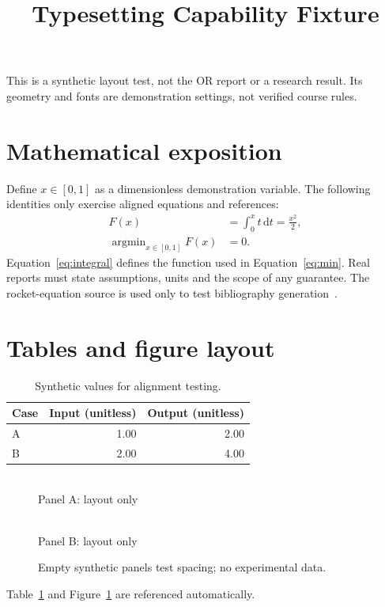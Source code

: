 \documentclass[11pt,a4paper]{article}
\title{Typesetting Capability Fixture}
\author{}\date{}
\begin{document}
\maketitle
\noindent This is a synthetic layout test, not the OR report or a research result.
Its geometry and fonts are demonstration settings, not verified course rules.
\tableofcontents
\section{Mathematical exposition}\label{sec:math}
Define $x\in[0,1]$ as a dimensionless demonstration variable. The following
identities only exercise aligned equations and references:
\begin{align}
F(x)&=\int_0^x t\,\mathrm{d}t=\frac{x^2}{2},\label{eq:integral}\\
\operatorname{argmin}_{x\in[0,1]}F(x)&=0.\label{eq:min}
\end{align}
Equation~\eqref{eq:integral} defines the function used in Equation~\eqref{eq:min}.
Real reports must state assumptions, units and the scope of any guarantee.
The rocket-equation source is used only to test bibliography generation~\citep{nasa-rocket}.
\section{Tables and figure layout}
\begin{table}[htbp]\centering
\caption{Synthetic values for alignment testing.}\label{tab:short}
\begin{tabular}{lrr}\toprule
Case & Input (unitless) & Output (unitless)\\\midrule
A & 1.00 & 2.00\\ B & 2.00 & 4.00\\\bottomrule
\end{tabular}\end{table}
\begin{figure}[htbp]\centering
\begin{minipage}{.45\linewidth}\centering\fbox{\rule{0pt}{18mm}\rule{.85\linewidth}{0pt}}
\\Panel A: layout only\end{minipage}\hfill
\begin{minipage}{.45\linewidth}\centering\fbox{\rule{0pt}{18mm}\rule{.85\linewidth}{0pt}}
\\Panel B: layout only\end{minipage}
\caption{Empty synthetic panels test spacing; no experimental data.}\label{fig:layout}
\end{figure}
Table~\ref{tab:short} and Figure~\ref{fig:layout} are referenced automatically.
\end{document}
